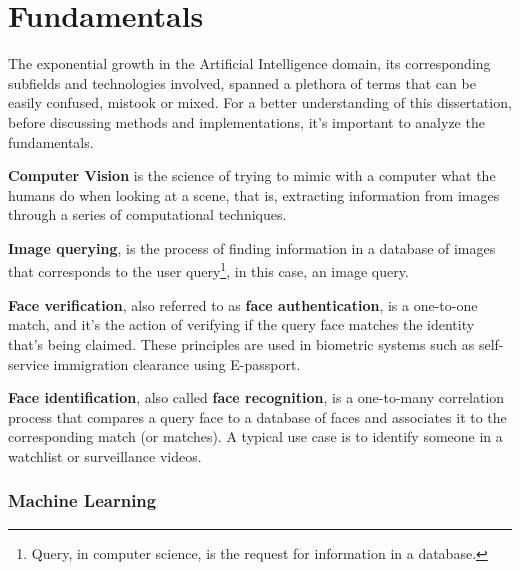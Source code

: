 \documentclass[class=report, crop=false, a4paper, 12pt]{standalone}
\begin{document}
\newpage
\section{Fundamentals}


The exponential growth in the Artificial Intelligence domain, its corresponding subfields and technologies involved, spanned a plethora of terms that can be easily confused, mistook or mixed. For a better understanding of this dissertation, before discussing methods and implementations, it's important to analyze the fundamentals.

\vspace{\baselineskip}
\noindent\textbf{Computer Vision} is the science of trying to mimic with a computer what the humans do when looking at a scene, that is, extracting information from images through a series of computational techniques. \autocite{szeliskiComputerVisionAlgorithms2022}

\vspace{\baselineskip}
\noindent\textbf{Image querying}, is the process of finding information in a database of images that corresponds to the user query\footnote{Query, in computer science, is the request for information in a database.}, in this case, an image query\autocite{bartoliniImageQuerying2009}.  

\vspace{\baselineskip}
\noindent\textbf{Face verification}, also referred to as \textbf{face authentication}, is a one-to-one match, and it's the action of verifying if the query face matches the identity that's being claimed. These principles are used in biometric systems such as self-service immigration clearance using E-passport. \autocite{liHandbookFaceRecognition2011}

\vspace{\baselineskip}
\noindent\textbf{Face identification}, also called \textbf{face recognition}, is a one-to-many correlation process that compares a query face to a database of faces and associates it to the corresponding match (or matches). A typical use case is to identify someone in a watchlist or surveillance videos. \autocite{liHandbookFaceRecognition2011} 

\vspace{\baselineskip}
\noindent\textbf{}

\subsubsection{Machine Learning}
\end{document}
